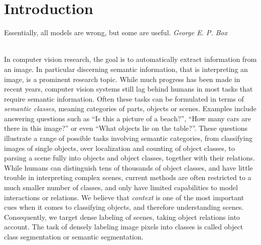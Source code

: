 \chapter{Introduction}
\vspace{1cm}
\hfill%
\begin{minipage}{.4\linewidth}
Essentially, all models are wrong, but some are useful. 
\flushright%
\emph{George E. P. Box}

\end{minipage}%
\\[2cm]
In computer vision research, the goal is to automatically extract information from an image.
In particular discerning semantic information, that is interpreting an image, is a prominent
research topic.
While much progress has been made in recent years, computer vision systems still lag behind
humans in most tasks that require semantic information. Often these tasks can be formulated
in terms of \emph{semantic classes}, meaning categories of parts, objects or scenes.
Examples include answering questions such as ``Is this a picture of a beach?'', ``How many
cars are there in this image?'' or even ``What objects lie on the table?''.
These questions illustrate a range of possible tasks involving semantic categories,
from classifying images of single objects, over localization and counting of object classes,
to parsing a scene fully into objects and object classes, together with their relations.
%
While humans can distinguish tens of thousands of object classes, and have
little trouble in interpreting complex scenes, current methods are often
restricted to a much smaller number of classes, and only have limited
capabilities to model interactions or relations.  We believe that
\emph{context} is one of the most important cues when it comes to classifying
objects, and therefore understanding scenes. Consequently, we target dense
labeling of scenes, taking object relations into account.  The task of densely
labeling image pixels into classes is called object class segmentation or
semantic segmentation.
\pagebreak

